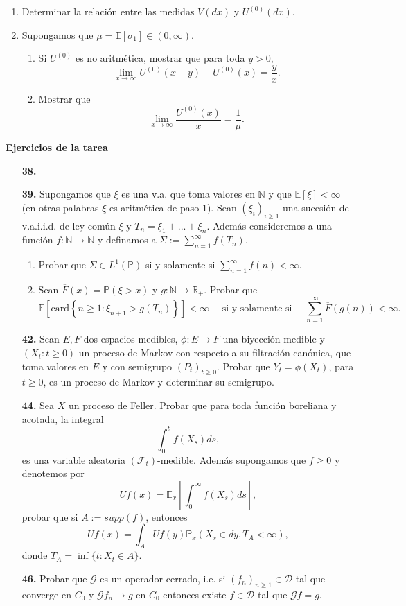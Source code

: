 \documentclass[letterpaper]{article}
\newcommand{\N}{\mathbb N}
\newcommand{\R}{\mathbb{R}}
\newcommand{\F}{\mathcal{F}}
\renewcommand{\to}{\rightarrow}
\newcommand{\E}{\mathbb{E}}
\renewcommand{\P}{\mathbb{P}}
\newcommand{\1}{\mathds{1}}
\theoremstyle{definition}
\theoremstyle{definition}
\theoremstyle{definition}
\theoremstyle{definition}
\theoremstyle{definition}
\begin{document}
\begin{enumerate}
    \begin{enumerate}
        \item Determinar la relación entre las medidas $V(dx)$ y $U^{(0)}(dx)$.
        \item Supongamos que $\mu=\E\left[\sigma_1\right]\in (0,\infty)$.
        \begin{enumerate}
            \item Si $U^{(0)}$ es no aritmética, mostrar que para toda $y>0$, 
            \[
                \lim_{x\to\infty}U^{(0)}(x+y)-U^{(0)}(x)=\frac{y}{x}.
            \]
            \item Mostrar que 
            \[
                \lim_{x\to\infty}\frac{U^{(0)}(x)}{x}=\frac{1}{\mu}.
            \]
        \end{enumerate}
    \end{enumerate}
\end{enumerate}
\begin{center}
    \Large{\textbf{Ejercicios de la tarea}}
\end{center}
\begin{enumerate}
    \item[\textbf{38.}] 
    \item[\textbf{39.}] Supongamos que $\xi$ es una v.a. que toma valores en $\N$ y que $\E\left[\xi\right]<\infty$ (en otras palabras $\xi$ es aritmética de paso 1). Sean $(\xi_i)_{i\geq1}$ una sucesión de v.a.i.i.d. de ley común $\xi$ y $T_n= \xi_1+...+\xi_n$. Además consideremos a una función $f:\N\to\N$ y definamos a $\Sigma:=\sum_{n=1}^{\infty}f(T_n)$.
    \begin{enumerate}
        \item Probar que $\Sigma\in L^1(\P)$ si y solamente si $\sum_{n=1}^\infty f(n)<\infty$.
        \item Sean $\overline{F}(x)=\P(\xi>x)$ y $g:\N\to \R_+$. Probar que 
        \[
            \E\left[\text{card}\left\{n\geq1: \xi_{n+1}>g(T_n)\right\}\right]<\infty \quad \text{ si y solamente si }\quad \sum_{n=1}^\infty\overline{F}(g(n))<\infty.
        \]
    \end{enumerate}
    \item[\textbf{42.}] Sean $E, F$ dos espacios medibles, $\phi:E\to F$ una biyección medible y $(X_t:t\geq0)$ un proceso de Markov con respecto a su filtración canónica, que toma valores en $E$ y con semigrupo $(P_t)_{t\geq0}$. Probar que $Y_t=\phi(X_t)$, para $t\geq0$, es un proceso de Markov y determinar su semigrupo.
    \item[\textbf{44.}] Sea $X$ un proceso de Feller. Probar que para toda función boreliana y acotada, la integral 
    \[
        \int_{0}^{t}f(X_s)ds,
    \]
    es una variable aleatoria $(\F_t)$-medible. Además supongamos que $f\geq0$ y denotemos por 
    \[
    Uf(x)=\E_x\left[\int_{0}^{\infty}f(X_s)ds\right],
    \]
    probar que si $A:=supp(f)$, entonces 
    \[
    Uf(x)=\int_AUf(y)\P_x(X_s\in dy,T_A<\infty),
    \]
    donde $T_A=\inf\{t:X_t\in A\}$.
    \item[\textbf{46.}] Probar que $\mathcal{G}$ es un operador cerrado, i.e. si $(f_n)_{n\geq1}\in \mathcal{D}$ tal que converge en $C_0$ y $\mathcal{G}f_n\to g$ en $C_0$ entonces existe $f\in \mathcal{D}$ tal que $\mathcal{G}f=g$.
\end{enumerate}
\end{document}
